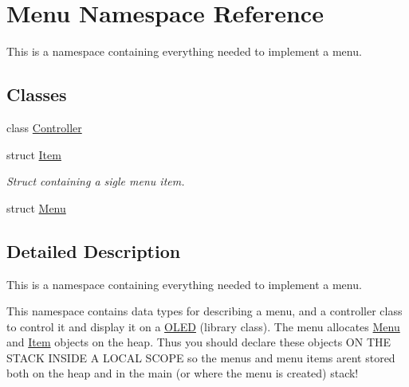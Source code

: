 \hypertarget{namespace_menu}{}\section{Menu Namespace Reference}
\label{namespace_menu}


This is a namespace containing everything needed to implement a menu.  


\subsection*{Classes}
\begin{DoxyCompactItemize}
\item 
class \hyperlink{class_menu_1_1_controller}{Controller}
\item 
struct \hyperlink{struct_menu_1_1_item}{Item}
\begin{DoxyCompactList}\small\item\em Struct containing a sigle menu item. \end{DoxyCompactList}\item 
struct \hyperlink{struct_menu_1_1_menu}{Menu}
\end{DoxyCompactItemize}


\subsection{Detailed Description}
This is a namespace containing everything needed to implement a menu. 

This namespace contains data types for describing a menu, and a controller class to control it and display it on a \hyperlink{class_o_l_e_d}{O\+L\+ED} (library class). The menu allocates \hyperlink{namespace_menu}{Menu} and \hyperlink{struct_menu_1_1_item}{Item} objects on the heap. Thus you should declare these objects ON T\+HE S\+T\+A\+CK I\+N\+S\+I\+DE A L\+O\+C\+AL S\+C\+O\+PE so the menus and menu items aren\textquotesingle{}t stored both on the heap and in the main (or where the menu is created) stack! 